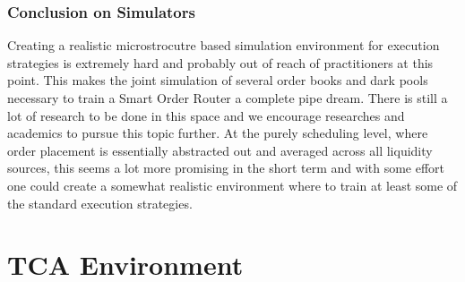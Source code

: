 \subsubsection{Conclusion on Simulators}
Creating a realistic microstrocutre based simulation environment for execution strategies is extremely hard and probably out of reach of practitioners at this point. This makes the joint simulation of several order books and dark pools necessary to train a Smart Order Router a complete pipe dream. There is still a lot of research to be done in this space and we encourage researches and academics to pursue this topic further. At the purely scheduling level, where order placement is essentially abstracted out and averaged across all liquidity sources, this seems a lot more promising in the short term and with some effort one could create a somewhat realistic environment where to train at least some of the standard execution strategies.

\section{TCA Environment}

